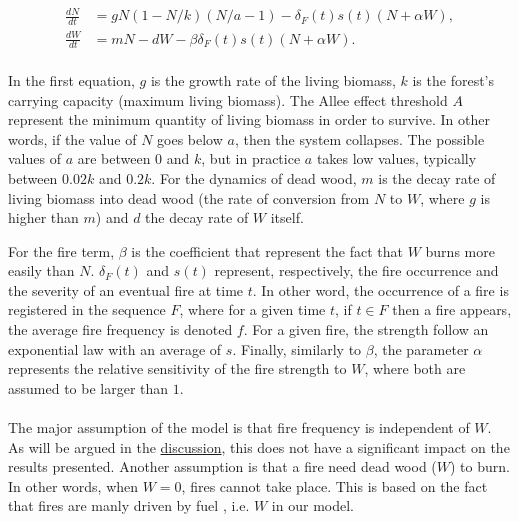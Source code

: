\documentclass{article}
\begin{document}
\paragraph{}

\begin{subequations}\label{eq:dim}
 \begin{align}
\frac{dN}{dt} & =  gN(1-N/k)(N/a-1) - \delta_F(t)s(t)(N+\alpha W), \\
\frac{dW}{dt} & =  mN -dW - \beta\delta_F(t)s(t)(N+\alpha W).
 \end{align}
\end{subequations}

\paragraph{} %
In the first equation, $g$ is the growth rate of the living biomass, $k$ is the forest's carrying capacity (maximum living biomass). 
The Allee effect threshold $A$ represent the minimum quantity of living biomass in order to survive. In other words, if the value of $N$ goes below $a$, then the system collapses. The possible values of $a$ are between $0$ and $k$, but in practice $a$ takes low values, typically between $0.02 k$ and $0.2 k$. For the dynamics of dead wood, $m$ is the decay rate of living biomass into dead wood (the rate of conversion from $N$ to $W$, where $g$ is higher than $m$) and $d$ the decay rate of $W$ itself. 

For the fire term, $\beta$ is the coefficient that represent the fact that $W$ burns more easily than $N$. $\delta_F(t)$ and $s(t)$ represent, respectively, the fire occurrence and the severity of an eventual fire at time $t$. In other word, the occurrence of a fire is registered in the sequence $F$, where for a given time $t$, if $t\in F$ then a fire appears, the average fire frequency is denoted $f$. For a given fire, the strength follow an exponential law \citep{gauthier_les_2001, cyr_forest_2009} with an average of $s$. Finally, similarly to $\beta$, the parameter $\alpha$ represents the relative sensitivity of the fire strength to $W$, where both are assumed to be larger than $1$.

\paragraph{} %
The major assumption of the model is that fire frequency is independent of $W$. As will be argued in the \hyperref[discussion_frequency_ass]{discussion}, this does not have a significant impact on the results presented. Another assumption is that a fire need dead wood ($W$) to burn. In other words, when $W=0$, fires cannot take place. This is based on the fact that fires are manly driven by fuel \citep{schoennagel_interaction_2004, stephens_effects_2012, syphard_comparing_2011, safford_effects_2009, stephens_experimental_2005}, i.e. $W$ in our model.
\end{document}
